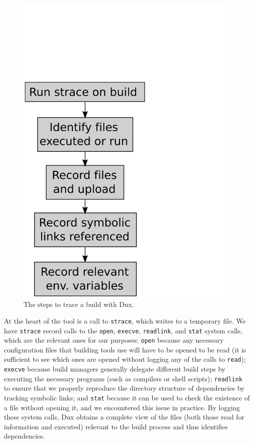 \documentclass[10pt,conference]{IEEEtran}
\begin{document}
\begin{figure}
\includegraphics[width=\columnwidth]{duxtrace}
\caption{The steps to trace a build with Dux.}
\end{figure}

At the heart of the tool is a call to \texttt{strace}, which writes to a temporary file. We have \texttt{strace}
record calls to the \texttt{open}, \texttt{execve}, \texttt{readlink}, and \texttt{stat} system calls,
which are the relevant
ones for our purposes: \texttt{open} because any necessary configuration files that building tools use will
have to be opened to be read (it is sufficient to see which ones are opened without logging any of the
calls to \texttt{read}); \texttt{execve} because build managers generally delegate different build steps by
executing the necessary programs (such as compilers or shell scripts); \texttt{readlink} to ensure that we
properly reproduce the directory structure of dependencies by tracking symbolic links; and \texttt{stat} because
it can be used to check the existence of a file without opening it, and we encountered this issue in practice.
By logging these system
calls, Dux obtains a complete view of the files (both those read for information and executed) relevant to the
build process and thus identifies dependencies.
\end{document}
